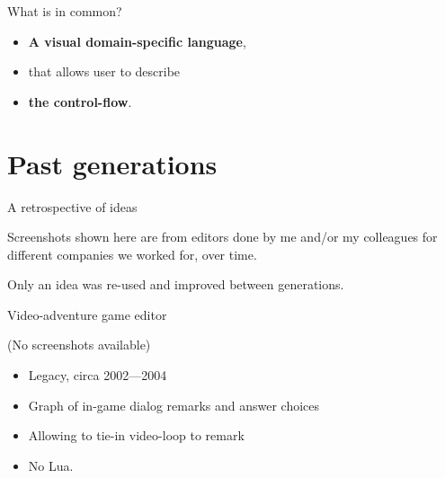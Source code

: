 \documentclass[handout]{beamer}
\begin{document}

\begin{frame}{What is in common?}

\begin{itemize}
\item \textbf{A visual domain-specific language},
\item that allows user to describe
\item \textbf{the control-flow}.
\end{itemize}

\end{frame}


\section{Past generations}


\begin{frame}{A retrospective of ideas}

Screenshots shown here are from editors done by
me and/or my colleagues for different companies
we worked for, over time.

Only an idea was re-used and improved between generations.

\end{frame}


\begin{frame}{Video-adventure game editor}

(No screenshots available)

\begin{itemize}
\item Legacy, circa 2002—2004
\item Graph of in-game dialog remarks and answer choices
\item Allowing to tie-in video-loop to remark
\item No Lua.
\end{itemize}

\end{frame}

\end{document}
